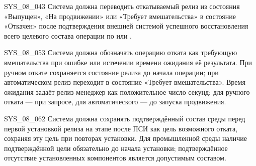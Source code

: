 \documentclass{tpks}
\begin{document}
\begin{req}{SYS_08_04}{3}
Система должна переводить откатываемый релиз из состояния «Выпущен», «На продвижении»
или «Требует вмешательства» в состояние «Откачен» после подтверждения внешней системой
успешного восстановления всего целевого состава операции по 
или .
\end{req}

\begin{req}{SYS_08_05}{3}
Система должна обозначать операцию отката как требующую вмешательства при ошибке
или истечении времени ожидания её результата. При ручном откате сохраняется
состояние релиза до начала операции; при автоматическом релиз переходит
в состояние «Требует вмешательства».
Время ожидания задаёт релиз-менеджер как положительное число секунд:
для ручного отката --- при запросе, для автоматического --- до запуска продвижения.
\end{req}

\begin{req}{SYS_08_06}{2}
Система должна сохранять подтверждённый состав среды перед первой установкой
релиза на этапе после ПСИ как цель возможного отката, сохраняя эту цель при повторах
установки. Для промышленной среды наличие подтверждённой цели обязательно до начала
установки; подтверждённое отсутствие установленных компонентов является допустимым составом.
\end{req}
\end{document}
